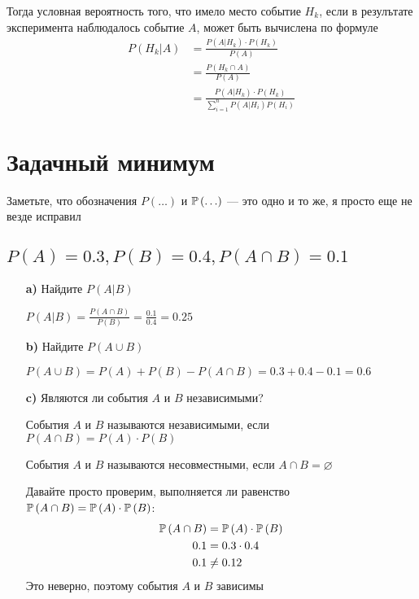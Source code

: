 \documentclass{article}
\begin{document}
Тогда условная вероятность того, что имело место событие $H_k$, если в резулътате эксперимента наблюдалось событие $A$, может быть вычислена по формуле
\begin{equation*}
    \begin{aligned}
        P(H_k|A)&=\frac{P(A|H_k)\cdot P(H_k)}{P(A)}\\
        &=\frac{P(H_k\cap A)}{P(A)}\\
        &=\frac{P(A|H_k)\cdot P(H_k)}{\sum_{i=1}^{n} P(A|H_i)P(H_i)}
    \end{aligned}
\end{equation*}

\newpage
\section{Задачный минимум}
Заметьте, что обозначения $P(\ldots)$ и $\mathbb{P}\left(\ldots\right)$ — это одно и то же, я просто еще не везде исправил
\subsection{$P(A)=0.3,P(B)=0.4,P(A\cap B)=0.1$}
\begin{enumerate}
    \item[\textbf{a)}] Найдите $P(A|B)$
    
    $P(A|B)=\displaystyle\frac{P(A\cap B)}{P(B)}=\frac{0.1}{0.4}=0.25$
    \item[\textbf{b)}] Найдите $P(A\cup B)$
    
    $P(A\cup B)=P(A)+P(B)-P(A\cap B)=0.3+0.4-0.1=0.6$
    \item[\textbf{c)}] Являются ли события $A$ и $B$ независимыми?

     События $A$ и $B$ называются независимыми, если $P(A\cap B)=P(A)\cdot P(B)$

     События $A$ и $B$ называются несовместными, если $A\cap B=\varnothing$

    Давайте просто проверим, выполняется ли равенство $\mathbb{P}\left(A\cap B\right)=\mathbb{P}\left(A\right)\cdot\mathbb{P}\left(B\right)$:
    $$\begin{aligned}
        \mathbb{P}\left(A\cap B\right)&=\mathbb{P}\left(A\right)\cdot\mathbb{P}\left(B\right)\\
        0.1&=0.3\cdot0.4\\
        0.1&\ne0.12
    \end{aligned}$$
    Это неверно, поэтому события $A$ и $B$ зависимы

\end{enumerate}
\end{document}
